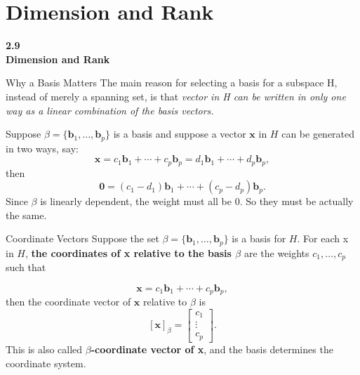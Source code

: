 \documentclass[aspectratio=169]{beamer}
\newcommand{\vect}[1]{\mathbf{#1}}
\newcommand{\sectioncard}[2]{%
  \begin{frame}[plain]
    \vfill\centering
    {\Huge\color{lectureorange}\bfseries #1\\[1ex]#2}
    \vfill
  \end{frame}}
\begin{document}
\section[Dimension and Rank]{Dimension and Rank}
\sectioncard{2.9}{Dimension and Rank}

\begin{frame}{Why a Basis Matters}
The main reason for selecting a basis for a subspace H, instead of merely a spanning set, is that \textit{vector in H can be written in only one way as a linear combination of the basis vectors.} 
\pause

Suppose $\beta=\{\vect b_1,\ldots,\vect b_p\}$ is a basis and suppose a vector $\vect x$ in $H$ can be generated in two ways, say:
\[
\vect x=c_1\vect b_1+\cdots+c_p\vect b_p
=d_1\vect b_1+\cdots+d_p\vect b_p,
\]
then
\[
\vect0=(c_1-d_1)\vect b_1+\cdots+(c_p-d_p)\vect b_p.
\]
Since $\beta$ is linearly dependent, the weight must all be 0. So they must be actually the same.
\end{frame}

\begin{frame}{Coordinate Vectors}
Suppose the set $\beta=\{\vect b_1,\ldots,\vect b_p\}$ is a basis for $H$. For each x in $H$, \textbf{the coordinates of x relative to the basis $\beta$} are the weights $c_1,\ldots,c_p$ such that

\[
\vect x=c_1\vect b_1+\cdots+c_p\vect b_p,
\]
then the coordinate vector of $\vect x$ relative to $\beta$ is
\[
\boxed{[\vect x]_\beta=
\begin{bmatrix}c_1\\\vdots\\c_p\end{bmatrix}}.
\]
This is also called \textbf{$\beta$-coordinate vector of x}, and the basis determines the coordinate system.
\end{frame}
\end{document}
